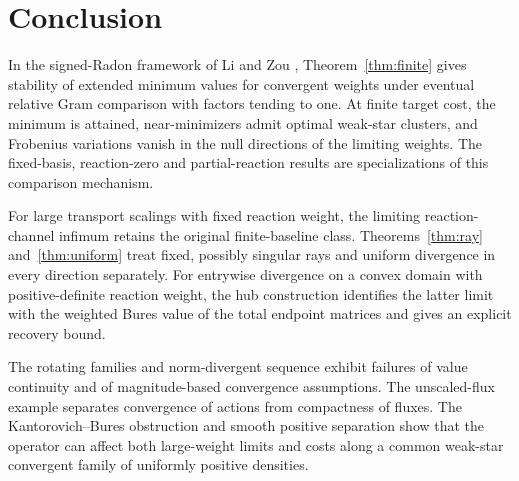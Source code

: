 \section{Conclusion}\label{sec:conclusion}
In the signed-Radon framework of Li and Zou \cite{LiZou},
Theorem~\ref{thm:finite} gives stability of extended minimum values for
convergent weights under eventual relative Gram comparison with factors
tending to one. At finite
target cost, the minimum is attained, near-minimizers admit optimal weak-star
clusters, and Frobenius variations vanish in the null directions of the
limiting weights. The fixed-basis, reaction-zero and partial-reaction results
are specializations of this comparison mechanism.

For large transport scalings with fixed reaction weight, the limiting
reaction-channel infimum retains the original finite-baseline class.
Theorems~\ref{thm:ray} and~\ref{thm:uniform} treat fixed, possibly singular
rays and uniform divergence in every direction separately. For entrywise
divergence on a convex domain with positive-definite reaction weight, the hub
construction identifies the latter limit with the weighted Bures value of
the total endpoint matrices and gives an explicit recovery bound.

The rotating families and norm-divergent sequence exhibit failures of value
continuity and of magnitude-based convergence assumptions. The unscaled-flux
example separates convergence of actions from compactness of fluxes. The
Kantorovich--Bures obstruction and smooth positive separation show that the
operator can affect both large-weight limits and costs along a common
weak-star convergent family of uniformly positive densities.
